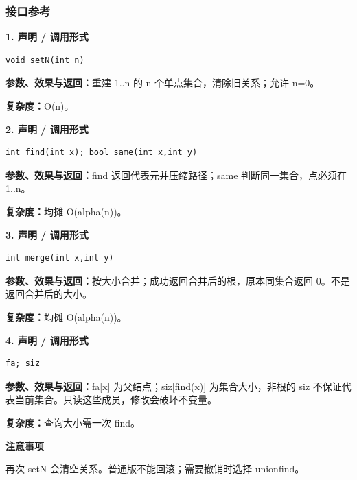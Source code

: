\documentclass[UTF8,a4paper,10pt]{ctexart}
\newcommand{\TemplNote}[1]{\textbf{注意事项}\par #1\par}
\begin{document}
\subsubsection*{接口参考}
\noindent\begin{minipage}{\textwidth}
\textbf{1. 声明 / 调用形式}
\begin{lstlisting}
void setN(int n)
\end{lstlisting}
\textbf{参数、效果与返回：}重建 1..n 的 n 个单点集合，清除旧关系；允许 n=0。

\textbf{复杂度：}O(n)。

\end{minipage}\par\vspace{0.4em}
\noindent\begin{minipage}{\textwidth}
\textbf{2. 声明 / 调用形式}
\begin{lstlisting}
int find(int x); bool same(int x,int y)
\end{lstlisting}
\textbf{参数、效果与返回：}find 返回代表元并压缩路径；same 判断同一集合，点必须在 1..n。

\textbf{复杂度：}均摊 O(alpha(n))。

\end{minipage}\par\vspace{0.4em}
\noindent\begin{minipage}{\textwidth}
\textbf{3. 声明 / 调用形式}
\begin{lstlisting}
int merge(int x,int y)
\end{lstlisting}
\textbf{参数、效果与返回：}按大小合并；成功返回合并后的根，原本同集合返回 0。不是返回合并后的大小。

\textbf{复杂度：}均摊 O(alpha(n))。

\end{minipage}\par\vspace{0.4em}
\noindent\begin{minipage}{\textwidth}
\textbf{4. 声明 / 调用形式}
\begin{lstlisting}
fa; siz
\end{lstlisting}
\textbf{参数、效果与返回：}fa[x] 为父结点；siz[find(x)] 为集合大小，非根的 siz 不保证代表当前集合。只读这些成员，修改会破坏不变量。

\textbf{复杂度：}查询大小需一次 find。

\TemplNote{再次 setN 会清空关系。普通版不能回滚；需要撤销时选择 unionfind。}
\end{minipage}\par\vspace{0.4em}
\clearpage
\end{document}
